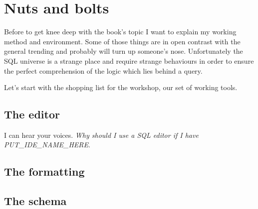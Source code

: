 \chapter{Nuts and bolts}
Before to get knee deep with the book's topic I want to explain my working method and environment.
Some of those things are in open contrast with the general trending and probably will turn up
someone's nose. Unfortunately the SQL universe is a strange place and require strange behaviours
in order to ensure the perfect comprehension of the logic which lies behind a query.\newline

Let's start with the shopping list for the workshop, our set of working tools.

\section{The editor}
I can hear your voices. \textit{Why should I use a SQL editor if I have PUT\_IDE\_NAME\_HERE}.  


\section{The formatting}


\section{The schema}